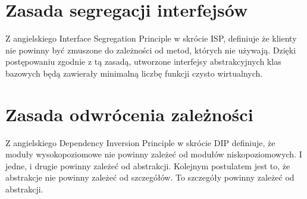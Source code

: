 \section{Zasada segregacji interfejsów}
Z angielskiego Interface Segregation Principle w skrócie ISP, definiuje że klienty nie powinny być zmuszone do zależności od metod, których nie używają\cite{martin2015zwinne}.
Dzięki postępowaniu zgodnie z tą zasadą, utworzone interfejsy abstrakcyjnych klas bazowych będą zawierały minimalną liczbę funkcji czysto wirtualnych.

\section{Zasada odwrócenia zależności}
Z angielskiego Dependency Inversion Principle w skrócie DIP definiuje, że moduły wysokopoziomowe nie powinny zależeć od modułów niskopoziomowych.
I jedne, i drugie powinny zależeć od abstrakcji\cite{martin2015zwinne}.
Kolejnym postulatem jest to, że abstrakcje nie powinny zależeć od szczegółów. To szczegóły powinny zależeć od abstrakcji.

